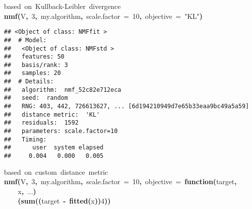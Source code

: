 \documentclass[a4paper]{article}\usepackage{graphicx, color}
\makeatletter
\newcommand{\hlnumber}[1]{\textcolor[rgb]{0,0,0}{#1}}%
\newcommand{\hlfunctioncall}[1]{\textcolor[rgb]{0.501960784313725,0,0.329411764705882}{\textbf{#1}}}%
\newcommand{\hlstring}[1]{\textcolor[rgb]{0.6,0.6,1}{#1}}%
\newcommand{\hlkeyword}[1]{\textcolor[rgb]{0,0,0}{\textbf{#1}}}%
\newcommand{\hlargument}[1]{\textcolor[rgb]{0.690196078431373,0.250980392156863,0.0196078431372549}{#1}}%
\newcommand{\hlcomment}[1]{\textcolor[rgb]{0.180392156862745,0.6,0.341176470588235}{#1}}%
\newcommand{\hlformalargs}[1]{\textcolor[rgb]{0.690196078431373,0.250980392156863,0.0196078431372549}{#1}}%
\newcommand{\hlsymbol}[1]{\textcolor[rgb]{0,0,0}{#1}}%
\newcommand{\hlstd}[1]{\textcolor[rgb]{0,0,0}{#1}}%
\newenvironment{kframe}{%
 \def\FrameCommand##1{\hskip\@totalleftmargin \hskip-\fboxsep
 \colorbox{shadecolor}{##1}\hskip-\fboxsep
     \hskip-\linewidth \hskip-\@totalleftmargin \hskip\columnwidth}%
 \MakeFramed {\advance\hsize-\width
   \@totalleftmargin\z@ \linewidth\hsize
   \@setminipage}}%
 {\par\unskip\endMakeFramed}
\newenvironment{knitrout}{}{} %
\makeatother
\begin{document}
\begin{knitrout}
\color{fgcolor}\begin{kframe}
\begin{flushleft}
\ttfamily\noindent
\hlcomment{\usebox{\hlnormalsizeboxhash}{\ }based{\ }on{\ }Kullback-Leibler{\ }divergence}\hspace*{\fill}\\
\hlstd{}\hlfunctioncall{nmf}\hlkeyword{(}\hlsymbol{V}\hlkeyword{,}{\ }\hlnumber{3}\hlkeyword{,}{\ }\hlsymbol{my.algorithm}\hlkeyword{,}{\ }\hlargument{scale.factor}{\ }\hlargument{=}{\ }\hlnumber{10}\hlkeyword{,}{\ }\hlargument{objective}{\ }\hlargument{=}{\ }\hlstring{"{}KL"{}}\hlkeyword{)}\mbox{}
\normalfont
\end{flushleft}
\begin{verbatim}
## <Object of class: NMFfit >
##  # Model:
##   <Object of class: NMFstd >
##   features: 50 
##   basis/rank: 3 
##   samples: 20 
##  # Details:
##   algorithm:  nmf_52c82e712eca 
##   seed:  random 
##   RNG: 403, 442, 726613627, ... [6d194210949d7e65b33eaa9bc49a5a59]
##   distance metric:  'KL' 
##   residuals:  1592 
##   parameters: scale.factor=10 
##   Timing:
##      user  system elapsed 
##     0.004   0.000   0.005 
\end{verbatim}
\begin{flushleft}
\ttfamily\noindent
\hlcomment{\usebox{\hlnormalsizeboxhash}{\ }based{\ }on{\ }custom{\ }distance{\ }metric}\hspace*{\fill}\\
\hlstd{}\hlfunctioncall{nmf}\hlkeyword{(}\hlsymbol{V}\hlkeyword{,}{\ }\hlnumber{3}\hlkeyword{,}{\ }\hlsymbol{my.algorithm}\hlkeyword{,}{\ }\hlargument{scale.factor}{\ }\hlargument{=}{\ }\hlnumber{10}\hlkeyword{,}{\ }\hlargument{objective}{\ }\hlargument{=}{\ }\hlkeyword{function}\hlkeyword{(}\hlformalargs{target}\hlkeyword{,}\hspace*{\fill}\\
\hlstd{}{\ }{\ }{\ }{\ }\hlformalargs{x}\hlkeyword{,}{\ }\hlformalargs{...}\hlkeyword{)}{\ }\hlkeyword{\usebox{\hlnormalsizeboxopenbrace}}\hspace*{\fill}\\
\hlstd{}{\ }{\ }{\ }{\ }\hlkeyword{(}\hlfunctioncall{sum}\hlkeyword{(}\hlkeyword{(}\hlsymbol{target}{\ }\hlkeyword{-}{\ }\hlfunctioncall{fitted}\hlkeyword{(}\hlsymbol{x}\hlkeyword{)}\hlkeyword{)}\hlkeyword{\usebox{\hlnormalsizeboxhat}}\hlnumber{4}\hlkeyword{)}\hlkeyword{)}\hlkeyword{\usebox{\hlnormalsizeboxhat}}\hlkeyword{\usebox{\hlnormalsizeboxopenbrace}}\hspace*{\fill}\\

\end{flushleft}
\end{kframe}
\end{knitrout}
\end{document}
